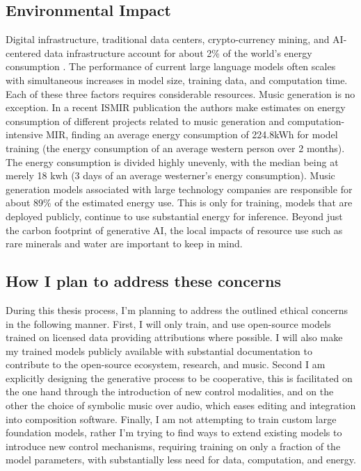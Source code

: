 \subsection{Environmental Impact}
Digital infrastructure, traditional data centers, crypto-currency mining, and AI-centered data infrastructure account for about 2\% of the world's energy consumption \cite{Marechal_2024}. The performance of current large language models often scales with simultaneous increases in model size, training data, and computation time.\cite{Kaplan_McCandlish_Henighan_Brown_Chess_Child_Gray_Radford_Wu_Amodei_2020}  Each of these three factors requires considerable resources. Music generation is no exception. In a recent ISMIR publication \cite{Holzapfel_Kaila_Jääskeläinen_2024} the authors make estimates on energy consumption of different projects related to music generation and computation-intensive MIR, finding an average energy consumption of 224.8kWh for model training (the energy consumption of an average western person over 2 months). The energy consumption is divided highly unevenly, with the median being at merely 18 kwh (3 days of an average westerner's energy consumption). Music generation models associated with large technology companies are responsible for about 89\% of the estimated energy use. This is only for training, models that are deployed publicly, continue to use substantial energy for inference. Beyond just the carbon footprint of generative AI, the local impacts of resource use such as rare minerals and water are important to keep in mind. 

\subsection{How  I plan to address these concerns}
During this thesis process, I’m planning to address the outlined ethical concerns in the following manner. First, I will only train, and use open-source models trained on licensed data providing attributions where possible. I will also make my trained models publicly available with substantial documentation to contribute to the open-source ecosystem, research, and music. Second I am explicitly designing the generative process to be cooperative, this is facilitated on the one hand through the introduction of new control modalities, and on the other the choice of symbolic music over audio, which eases editing and integration into composition software. Finally, I am not attempting to train custom large foundation models, rather I’m trying to find ways to extend existing models to introduce new control mechanisms, requiring training on only a fraction of the model parameters, with substantially less need for data, computation, and energy. 

